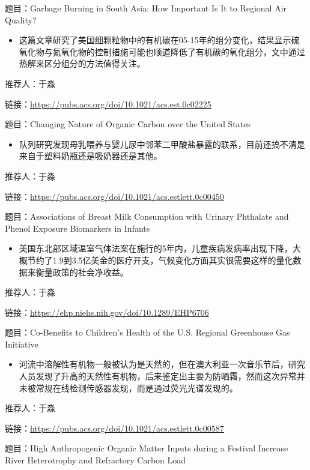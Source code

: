 \documentclass[]{book}
\providecommand{\tightlist}{%
  \setlength{\itemsep}{0pt}\setlength{\parskip}{0pt}}
\begin{document}
题目：Garbage Burning in South Asia: How Important Is It to Regional Air Quality?

\begin{itemize}
\tightlist
\item
  这篇文章研究了美国细颗粒物中的有机碳在05-15年的组分变化，结果显示硫氧化物与氮氧化物的控制措施可能也顺道降低了有机碳的氧化组分，文中通过热解来区分组分的方法值得关注。
\end{itemize}

推荐人：于淼

链接：\url{https://pubs.acs.org/doi/10.1021/acs.est.0c02225}

题目：Changing Nature of Organic Carbon over the United States

\begin{itemize}
\tightlist
\item
  队列研究发现母乳喂养与婴儿尿中邻苯二甲酸盐暴露的联系，目前还搞不清是来自于塑料奶瓶还是吸奶器还是其他。
\end{itemize}

推荐人：于淼

链接：\url{https://pubs.acs.org/doi/10.1021/acs.estlett.0c00450}

题目：Associations of Breast Milk Consumption with Urinary Phthalate and Phenol Exposure Biomarkers in Infants

\begin{itemize}
\tightlist
\item
  美国东北部区域温室气体法案在施行的5年内，儿童疾病发病率出现下降，大概节约了1.9到3.5亿美金的医疗开支，气候变化方面其实很需要这样的量化数据来衡量政策的社会净收益。
\end{itemize}

推荐人：于淼

链接：\url{https://ehp.niehs.nih.gov/doi/10.1289/EHP6706}

题目：Co-Benefits to Children's Health of the U.S. Regional Greenhouse Gas Initiative

\begin{itemize}
\tightlist
\item
  河流中溶解性有机物一般被认为是天然的，但在澳大利亚一次音乐节后，研究人员发现了升高的天然性有机物，后来鉴定出主要为防晒霜，然而这次异常并未被常规在线检测传感器发现，而是通过荧光光谱发现的。
\end{itemize}

推荐人：于淼

链接：\url{https://pubs.acs.org/doi/10.1021/acs.estlett.0c00587}

题目：High Anthropogenic Organic Matter Inputs during a Festival Increase River Heterotrophy and Refractory Carbon Load
\end{document}
